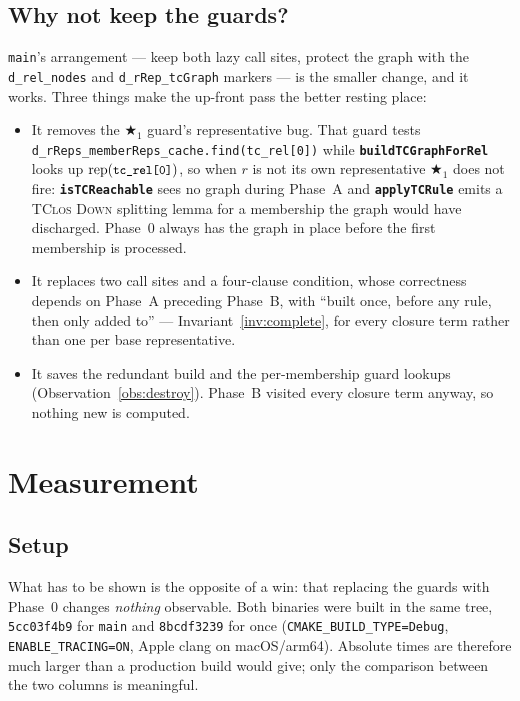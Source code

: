 \documentclass[11pt,a4paper]{article}
\newcommand{\code}[1]{\texttt{\small #1}}
\newcommand{\fn}[1]{\texttt{\small\bfseries #1}}
\newcommand{\rep}[1]{\mathrm{rep}(#1)}
\theoremstyle{definition}
\begin{document}
\subsection{Why not keep the guards?}\label{sec:whynotguards}

\code{main}'s arrangement --- keep both lazy call sites, protect the graph with
the \code{d\_rel\_nodes} and \code{d\_rRep\_tcGraph} markers --- is the smaller
change, and it works. Three things make the up-front pass the better resting
place:

\begin{itemize}[leftmargin=*,itemsep=1pt]
\item It removes the $\bigstar_1$ guard's representative bug. That guard tests
  \code{d\_rReps\_memberReps\_cache.find(tc\_rel[0])} while
  \fn{buildTCGraphForRel} looks up $\rep{\code{tc\_rel[0]}}$, so when $r$ is not
  its own representative $\bigstar_1$ does not fire: \fn{isTCReachable} sees no
  graph during Phase~A and \fn{applyTCRule} emits a \textsc{TClos Down} splitting
  lemma for a membership the graph would have discharged. Phase~0 always has the
  graph in place before the first membership is processed.
\item It replaces two call sites and a four-clause condition, whose correctness
  depends on Phase~A preceding Phase~B, with ``built once, before any rule, then
  only added to'' --- Invariant~\ref{inv:complete}, for every closure term rather
  than one per base representative.
\item It saves the redundant build and the per-membership guard lookups
  (Observation~\ref{obs:destroy}). Phase~B visited every closure term anyway, so
  nothing new is computed.
\end{itemize}

\section{Measurement}\label{sec:measure}

\subsection{Setup}

What has to be shown is the opposite of a win: that replacing the guards with
Phase~0 changes \emph{nothing} observable. Both binaries were built in the same
tree, \code{5cc03f4b9} for \code{main} and \code{8bcdf3239} for once
(\code{CMAKE\_BUILD\_TYPE=Debug}, \code{ENABLE\_TRACING=ON}, Apple clang on
macOS/arm64). Absolute times are therefore much larger than a production build
would give; only the comparison between the two columns is meaningful.
\end{document}
